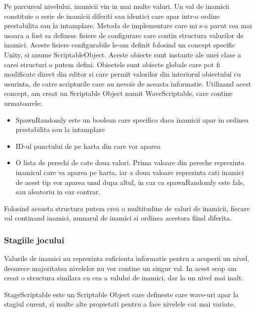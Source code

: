 \documentclass[12pt, a4paper]{article}
\begin{document}
	Pe parcursul nivelului, inamicii vin in mai multe valuri. Un val de inamicii constituie o serie de inamicii diferiti sau identici care apar intr-o ordine prestabilita sau la intamplare. Metoda de implementare care mi s-a parut cea mai usoara a fost sa definesc fisiere de configurare care contin structura valurilor de inamici. Aceste fisiere configurabile le-am definit folosind un concept specific Unity, si anume ScriptableObject. Aceste obiecte sunt instante ale unei clase a carei structuri o putem defini. Obiectele sunt obiecte globale care pot fi modificate direct din editor si care permit valorilor din interiorul obiectului cu usurinta, de catre scripturile care au nevoie de aceasta informatie. Utilizand acest concept, am creat un Scriptable Object numit WaveScriptable, care contine urmatoarele:
	
	\begin{itemize}
		\item SpawnRandomly este un boolean care specifica daca inamicii apar in ordinea prestabilita sau la intamplare
		\item ID-ul punctului de pe harta din care vor aparea
		\item O lista de perechi de cate doua valori. Prima valoare din pereche reprezinta inamicul care va aparea pe harta, iar a doua valoare reprezinta cati inamici de acest tip vor aparea unul dupa altul, in caz ca spawnRandomly este fals, sau aleatoriu in caz contrar.
	\end{itemize}

	Folosind aceasta structura putem crea o multitudine de valuri de inamicii, fiecare val continand inamici, numarul de inamici si ordinea acestora fiind diferita.
	
	
	
	
	
	\subsubsection{Stagiile jocului}
	\label{section: stageScriptable}
	
	Valurile de inamici nu reprezinta suficienta informatie pentru a acoperii un nivel, deoarece majoritatea nivelelor nu vor contine un singur val. In acest scop am creat o structura similara cu cea a valului de inamici, dar la un nivel mai inalt.
	\newline
	
	StageScriptable este un Scriptable Object care defineste care wave-uri apar la stagiul curent, si multe alte propietati pentru a face nivelele cat mai variate.
	
\end{document}
